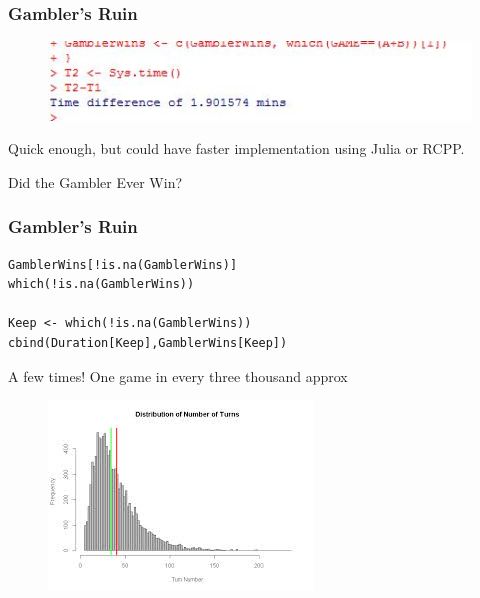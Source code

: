 \documentclass[MAIN.tex]{subfiles}
\begin{document}
\begin{frame}[fragile]
	\frametitle{Gambler's Ruin}
\begin{figure}
\centering
\includegraphics[width=0.9\linewidth]{images/speedgamblerruin}

\end{figure}


Quick enough, but could have faster implementation using Julia or RCPP.
\end{frame}
\begin{frame}[fragile]
Did the Gambler Ever Win?


	\frametitle{Gambler's Ruin}
\begin{framed}
	\begin{verbatim}
GamblerWins[!is.na(GamblerWins)]
which(!is.na(GamblerWins))

Keep <- which(!is.na(GamblerWins))
cbind(Duration[Keep],GamblerWins[Keep])

\end{verbatim}
\end{framed}

A few times! One game in every three thousand approx

\end{frame}

\begin{frame}
	\begin{figure}
\centering
\includegraphics[width=1.1\linewidth]{images/gamblerruin}

\end{figure}

\end{frame}
\end{document}
